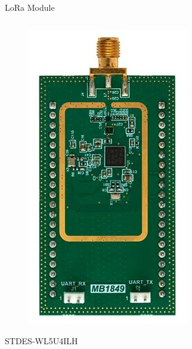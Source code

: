 \documentclass[hyphens]{beamer}
\begin{document}
\begin{frame}{LoRa Module}
\begin{columns}[T]
\begin{column}{.3\textwidth}
    \centering
    \begin{figure}
        \includegraphics[width=.9\linewidth]{img/STDES-WL5U4ILH.jpg}
    \end{figure}
    STDES-WL5U4ILH
\end{column}
\hfil
\begin{column}{.3\textwidth}
    \centering
    \begin{figure}

\end{figure}
\end{column}
\end{columns}
\end{frame}
\end{document}
